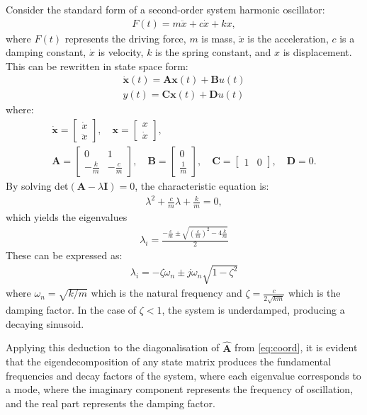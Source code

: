 Consider the standard form of a second-order system harmonic oscillator:
\begin{align}
    F(t) = m\ddot{x} + c\dot{x} + kx,
\end{align}
where $F(t)$ represents the driving force, $m$ is mass, $\ddot{x}$ is the acceleration, $c$ is a damping constant, $\dot{x}$ is velocity, $k$ is the spring constant, and $x$ is displacement. This can be rewritten in state space form:
\begin{align}
\dot{\mathbf{x}}(t) = \mathbf{A}\mathbf{x}(t) + \mathbf{B}u(t) \\
y(t) = \mathbf{C}\mathbf{x}(t) + \mathbf{D}u(t)
\end{align}
where:
\begin{gather}
\dot{\mathbf{x}} = \begin{bmatrix} \dot{x} \\ \ddot{x} \end{bmatrix}, \quad
\mathbf{x} = \begin{bmatrix} x \\ \dot{x} \end{bmatrix}, \\
\mathbf{A} = \begin{bmatrix} 0 & 1 \\ -\frac{k}{m} & -\frac{c}{m} \end{bmatrix}, \quad
\mathbf{B} = \begin{bmatrix} 0 \\ \frac{1}{m} \end{bmatrix}, \quad
\mathbf{C} = \begin{bmatrix} 1 & 0 \end{bmatrix}, \quad
\mathbf{D} = 0.
\end{gather}
By solving det$(\mathbf{A} - \lambda \mathbf{I}) = 0$, the characteristic equation is:
\begin{align}
\lambda^2 + \frac{c}{m} \lambda + \frac{k}{m} = 0,
\end{align}
which yields the eigenvalues
\begin{align}
\label{eq:eigs}
\lambda_i = \frac{-\frac{c}{m} \pm \sqrt{(\frac{c}{m})^2 - 4\frac{k}{m}}}{2}
\end{align}
These can be expressed as:
\begin{align}
\lambda_i = -\zeta\omega_n \pm j\omega_n\sqrt{1 - \zeta^2}
\end{align}
where $\omega_n = \sqrt{k/m}$ which is the natural frequency and $\zeta = \frac{c}{2\sqrt{km}}$ which is the damping factor. In the case of $\zeta < 1$, the system is underdamped, producing a decaying sinusoid.

Applying this deduction to the diagonalisation of $\hat{\mathbf{A}}$ from \ref{eq:coord}, it is evident that the eigendecomposition of any state matrix produces the fundamental frequencies and decay factors of the system, where each eigenvalue corresponds to a mode, where the imaginary component represents the frequency of oscillation, and the real part represents the damping factor.
